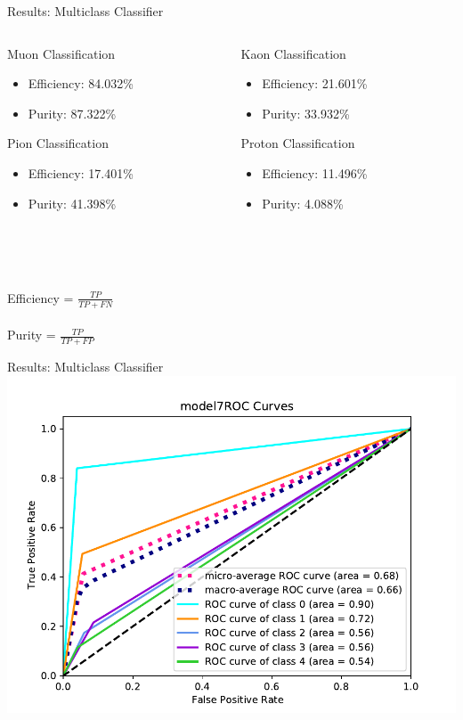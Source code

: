\documentclass[10pt,handout]{beamer}
\begin{document}
\begin{frame}{Results: Multiclass Classifier}
\begin{columns}
\begin{column}{0.5\textwidth}
Muon Classification
\begin{itemize}
\item Efficiency: 84.032\%
\item Purity: 87.322\%
\end{itemize}
Pion Classification
\begin{itemize}
\item Efficiency: 17.401\%
\item Purity: 41.398\%
\end{itemize}
\end{column}
\begin{column}{0.5\textwidth}
Kaon Classification
\begin{itemize}
\item Efficiency: 21.601\%
\item Purity: 33.932\%
\end{itemize}
Proton Classification
\begin{itemize}
\item Efficiency: 11.496\%
\item Purity: 4.088\%
\end{itemize}
\end{column}
\end{columns}

\quad  \\
\quad  \\
\quad \quad \\
Efficiency = $\frac{TP}{TP+FN}$ \\
\quad \\
Purity = $\frac{TP}{TP+FP}$
\end{frame}




\begin{frame}{Results: Multiclass Classifier}
\centering
\includegraphics[scale=0.6]{model7_ROCcurves.pdf}
\end{frame}
\end{document}
